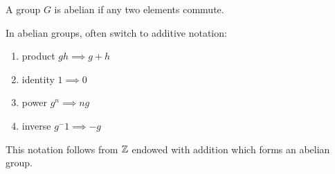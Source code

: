\begin{definition}
    A group \(G\) is abelian if any two elements commute.
\end{definition}

In abelian groups, often switch to additive notation:
\begin{enumerate}
    \item product \(gh \implies g + h\)
    \item identity \(1 \implies 0\)
    \item power \(g^n \implies ng\)
    \item inverse \(g^-1 \implies -g\)
\end{enumerate}
This notation follows from \(\mathbb{Z}\) endowed with addition which forms an abelian group.
